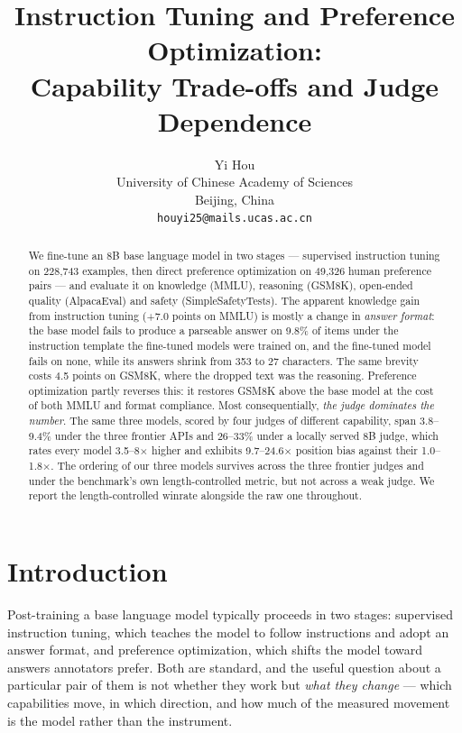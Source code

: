 \documentclass{article}
\title{Instruction Tuning and Preference Optimization:\\
Capability Trade-offs and Judge Dependence}
\author{%
  Yi Hou \\
  University of Chinese Academy of Sciences \\
  Beijing, China \\
  \texttt{houyi25@mails.ucas.ac.cn} \\
}
\begin{document}
\maketitle

\begin{abstract}
We fine-tune an 8B base language model in two stages --- supervised instruction
tuning on 228{,}743 examples, then direct preference optimization on 49{,}326
human preference pairs --- and evaluate it on knowledge (MMLU), reasoning
(GSM8K), open-ended quality (AlpacaEval) and safety (SimpleSafetyTests).
The apparent knowledge gain from instruction
tuning (+7.0 points on MMLU) is mostly a change in \emph{answer format}: the base
model fails to produce a parseable answer on 9.8\% of items under the
instruction template the fine-tuned models were trained on, and the fine-tuned
model fails on none, while
its answers shrink from 353 to 27 characters. The same brevity costs 4.5 points
on GSM8K, where the dropped text was the reasoning. Preference
optimization partly reverses this: it restores GSM8K above the base model at the
cost of both MMLU and format compliance. Most consequentially,
\emph{the judge dominates the number}. The same three models, scored by four
judges of different capability, span 3.8--9.4\% under the three frontier APIs and
26--33\% under a locally served 8B judge, which rates every model 3.5--8$\times$
higher and exhibits 9.7--24.6$\times$ position bias against their
1.0--1.8$\times$. The ordering of our three models survives across the three
frontier judges and under the benchmark's own length-controlled metric, but not
across a weak judge. We report the length-controlled winrate alongside the raw
one throughout.
\end{abstract}

\section{Introduction}

Post-training a base language model typically proceeds in two stages: supervised
instruction tuning, which teaches the model to follow instructions and adopt an
answer format, and preference optimization, which shifts the model toward answers
annotators prefer. Both are standard, and the useful question about a
particular pair of them is not whether they work but \emph{what they change} ---
which capabilities move, in which direction, and how much of the measured
movement is the model rather than the instrument.
\end{document}
